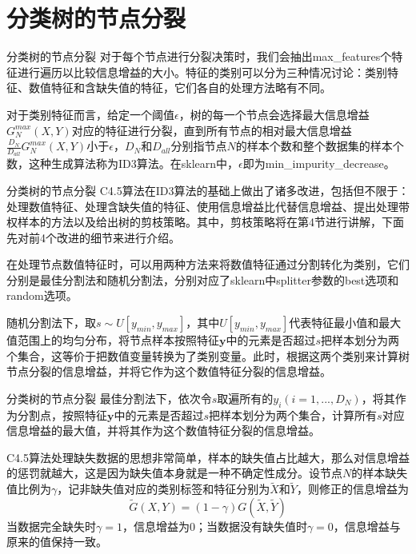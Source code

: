 \documentclass{ctexbeamer}        %
\begin{document}
\section{分类树的节点分裂}

\begin{frame}{分类树的节点分裂}
对于每个节点进行分裂决策时，我们会抽出max\_features个特征进行遍历以比较信息增益的大小。特征的类别可以分为三种情况讨论：类别特征、数值特征和含缺失值的特征，它们各自的处理方法略有不同。
\newline

对于类别特征而言，给定一个阈值$\epsilon$，树的每一个节点会选择最大信息增益$G^{max}_N(X,Y)$对应的特征进行分裂，直到所有节点的相对最大信息增益$\frac{D_N}{D_{all}}G^{max}_N(X,Y)$小于$\epsilon$，$D_N$和$D_{all}$分别指节点$N$的样本个数和整个数据集的样本个数，这种生成算法称为ID3算法。在sklearn中，$\epsilon$即为min\_impurity\_decrease。
\end{frame}

\begin{frame}{分类树的节点分裂}
C4.5算法在ID3算法的基础上做出了诸多改进，包括但不限于：处理数值特征、处理含缺失值的特征、使用信息增益比代替信息增益、提出处理带权样本的方法以及给出树的剪枝策略。其中，剪枝策略将在第4节进行讲解，下面先对前4个改进的细节来进行介绍。
\newline

在处理节点数值特征时，可以用两种方法来将数值特征通过分割转化为类别，它们分别是最佳分割法和随机分割法，分别对应了sklearn中splitter参数的best选项和random选项。
\newline

随机分割法下，取$s\sim U[y_{min}, y_{max}]$，其中$U[y_{min}, y_{max}]$代表特征最小值和最大值范围上的均匀分布，将节点样本按照特征$\mathbf{y}$中的元素是否超过$s$把样本划分为两个集合，这等价于把数值变量转换为了类别变量。此时，根据这两个类别来计算树节点分裂的信息增益，并将它作为这个数值特征分裂的信息增益。
\end{frame}

\begin{frame}{分类树的节点分裂}
最佳分割法下，依次令$s$取遍所有的$y_i(i=1,...,D_N)$，将其作为分割点，按照特征$\mathbf{y}$中的元素是否超过$s$把样本划分为两个集合，计算所有$s$对应信息增益的最大值，并将其作为这个数值特征分裂的信息增益。
\newline

C4.5算法处理缺失数据的思想非常简单，样本的缺失值占比越大，那么对信息增益的惩罚就越大，这是因为缺失值本身就是一种不确定性成分。设节点$N$的样本缺失值比例为$\gamma$，记非缺失值对应的类别标签和特征分别为$\tilde{X}$和$\tilde{Y}$，则修正的信息增益为
$$
\tilde{G}(X,Y) = (1-\gamma)G(\tilde{X},\tilde{Y})
$$
当数据完全缺失时$\gamma=1$，信息增益为0；当数据没有缺失值时$\gamma=0$，信息增益与原来的值保持一致。
\end{frame}
\end{document}
